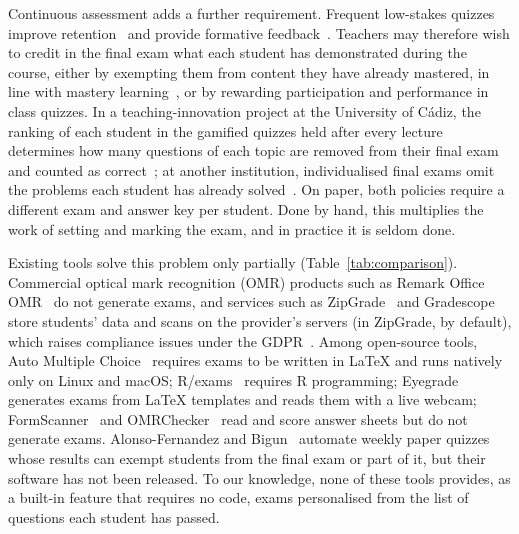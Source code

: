 \documentclass[preprint,12pt, a4paper]{elsarticle}
\begin{document}
Continuous assessment adds a further requirement. Frequent low-stakes quizzes improve retention~\cite{roediger2006} and provide formative feedback~\cite{black1998,hattie2007}. Teachers may therefore wish to credit in the final exam what each student has demonstrated during the course, either by exempting them from content they have already mastered, in line with mastery learning~\cite{bloom1968}, or by rewarding participation and performance in class quizzes. In a teaching-innovation project at the University of Cádiz, the ranking of each student in the gamified quizzes held after every lecture determines how many questions of each topic are removed from their final exam and counted as correct~\cite{gutierrez2018}; at another institution, individualised final exams omit the problems each student has already solved~\cite{omalley2025}. On paper, both policies require a different exam and answer key per student. Done by hand, this multiplies the work of setting and marking the exam, and in practice it is seldom done.

Existing tools solve this problem only partially (Table~\ref{tab:comparison}). Commercial optical mark recognition (OMR) products such as Remark Office OMR~\cite{remark} do not generate exams, and services such as ZipGrade~\cite{zipgrade} and Gradescope~\cite{gradescope} store students' data and scans on the provider's servers (in ZipGrade, by default), which raises compliance issues under the GDPR~\cite{gdpr}. Among open-source tools, Auto Multiple Choice~\cite{amc} requires exams to be written in \LaTeX{} and runs natively only on Linux and macOS; R/exams~\cite{zeileis2014} requires R programming; Eyegrade~\cite{fisteus2013} generates exams from \LaTeX{} templates and reads them with a live webcam; FormScanner~\cite{formscanner} and OMRChecker~\cite{omrchecker} read and score answer sheets but do not generate exams. Alonso-Fernandez and Bigun~\cite{alonso2022} automate weekly paper quizzes whose results can exempt students from the final exam or part of it, but their software has not been released. To our knowledge, none of these tools provides, as a built-in feature that requires no code, exams personalised from the list of questions each student has passed.
\end{document}
